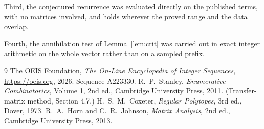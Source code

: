 \documentclass[11pt,a4paper]{article}
\theoremstyle{plain}
\theoremstyle{definition}
\begin{document}
Third, the conjectured recurrence was evaluated directly on the published terms, with no
matrices involved, and holds wherever the proved range and the data overlap.

Fourth, the annihilation test of Lemma~\ref{lem:crit} was carried out in exact integer
arithmetic on the whole vector rather than on a sampled prefix.

\begin{thebibliography}{9}
 The OEIS Foundation, \emph{The On-Line Encyclopedia of Integer
Sequences}, \url{https://oeis.org}, 2026. Sequence A223330.
 R.~P.~Stanley, \emph{Enumerative Combinatorics}, Volume 1, 2nd ed.,
Cambridge University Press, 2011. (Transfer-matrix method, Section 4.7.)
 H.~S.~M.~Coxeter, \emph{Regular Polytopes}, 3rd ed., Dover, 1973.
 R.~A.~Horn and C.~R.~Johnson, \emph{Matrix Analysis}, 2nd ed., Cambridge
University Press, 2013.
\end{thebibliography}
\end{document}
